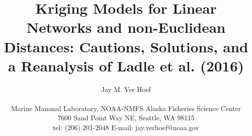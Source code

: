 \documentclass[11pt, titlepage]{article}\usepackage[]{graphicx}\usepackage[]{color}
\begin{document}

\titlepage
\title {Kriging Models for Linear Networks and non-Euclidean Distances: Cautions, Solutions, and a Reanalysis of Ladle et al. (2016)}
\author{Jay M. Ver Hoef \\
\hrulefill \\ 
Marine Mammal Laboratory, NOAA-NMFS Alaska Fisheries Science Center\\
7600 Sand Point Way NE, Seattle, WA 98115\\
tel: (206) 201-2048 \hspace{.5cm} E-mail: jay.verhoef@noaa.gov\\
\hrulefill \\
}

\maketitle
\end{document}
